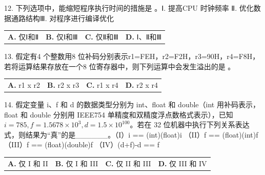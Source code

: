 \documentclass[UTF8,11pt]{ctexart}
\begin{document}
12. 下列选项中，能缩短程序执行时间的措施是 。Ⅰ. 提高CPU 时钟频率 Ⅱ. 优化数据通路结构Ⅲ. 对程序进行编译优化


\begin{center}\begin{tabular}{>{\raggedright\arraybackslash}p{\dimexpr(\linewidth-8\tabcolsep)/4\relax}>{\raggedright\arraybackslash}p{\dimexpr(\linewidth-8\tabcolsep)/4\relax}>{\raggedright\arraybackslash}p{\dimexpr(\linewidth-8\tabcolsep)/4\relax}>{\raggedright\arraybackslash}p{\dimexpr(\linewidth-8\tabcolsep)/4\relax}}
\textbf{A.} 仅Ⅰ和Ⅱ & \textbf{B.} 仅Ⅰ和Ⅲ & \textbf{C.} 仅Ⅱ和Ⅲ & \textbf{D.} Ⅰ、Ⅱ和Ⅲ\\[.35em]\end{tabular}\end{center}

13. 假定有4 个整数用8 位补码分别表示r1=FEH，r2=F2H，r3=90H，r4=F8H，若将运算结果存放在一个8 位寄存器中，则下列运算中会发生溢出的是 。


\begin{center}\begin{tabular}{>{\raggedright\arraybackslash}p{\dimexpr(\linewidth-8\tabcolsep)/4\relax}>{\raggedright\arraybackslash}p{\dimexpr(\linewidth-8\tabcolsep)/4\relax}>{\raggedright\arraybackslash}p{\dimexpr(\linewidth-8\tabcolsep)/4\relax}>{\raggedright\arraybackslash}p{\dimexpr(\linewidth-8\tabcolsep)/4\relax}}
\textbf{A.} r1 x r2 & \textbf{B.} r2 x r3 & \textbf{C.} r1 x r4 & \textbf{D.} r2 x r4\\[.35em]\end{tabular}\end{center}

14. 假定变量 i、f 和 d 的数据类型分别为 int、float 和 double（int 用补码表示，float 和 double 分别用 IEEE754 单精度和双精度浮点数格式表示），已知 \(\displaystyle i=785,\allowbreak f=1.5678\times10^3,\allowbreak d=1.5\times10^{100}\)。若在 32 位机器中执行下列关系表达式，则结果为“真”的是\_\_\_\_\_\_。（I）i == (int)(float)i （II）f == (float)(int)f （III）f == (float)(double)f （IV）(d+f)-d == f


\begin{center}\begin{tabular}{>{\raggedright\arraybackslash}p{\dimexpr(\linewidth-8\tabcolsep)/4\relax}>{\raggedright\arraybackslash}p{\dimexpr(\linewidth-8\tabcolsep)/4\relax}>{\raggedright\arraybackslash}p{\dimexpr(\linewidth-8\tabcolsep)/4\relax}>{\raggedright\arraybackslash}p{\dimexpr(\linewidth-8\tabcolsep)/4\relax}}
\textbf{A.} 仅 I 和 II & \textbf{B.} 仅 I 和 III & \textbf{C.} 仅 II 和 III & \textbf{D.} 仅 III 和 IV\\[.35em]\end{tabular}\end{center}
\end{document}
